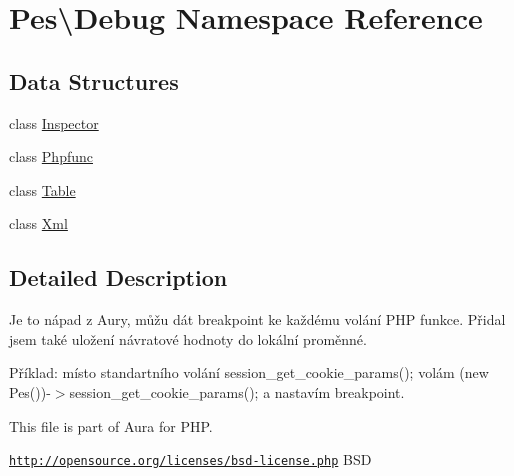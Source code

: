 \hypertarget{namespace_pes_1_1_debug}{}\section{Pes\textbackslash{}Debug Namespace Reference}
\label{namespace_pes_1_1_debug}
\subsection*{Data Structures}
\begin{DoxyCompactItemize}
\item 
class \mbox{\hyperlink{class_pes_1_1_debug_1_1_inspector}{Inspector}}
\item 
class \mbox{\hyperlink{class_pes_1_1_debug_1_1_phpfunc}{Phpfunc}}
\item 
class \mbox{\hyperlink{class_pes_1_1_debug_1_1_table}{Table}}
\item 
class \mbox{\hyperlink{class_pes_1_1_debug_1_1_xml}{Xml}}
\end{DoxyCompactItemize}


\subsection{Detailed Description}
Je to nápad z Aury, můžu dát breakpoint ke každému volání P\+HP funkce. Přidal jsem také uložení návratové hodnoty do lokální proměnné.

Příklad\+: místo standartního volání session\+\_\+get\+\_\+cookie\+\_\+params(); volám (new Pes())-\/$>$session\+\_\+get\+\_\+cookie\+\_\+params(); a nastavím breakpoint.

This file is part of Aura for P\+HP.

\href{http://opensource.org/licenses/bsd-license.php}{\tt http\+://opensource.\+org/licenses/bsd-\/license.\+php} B\+SD 
